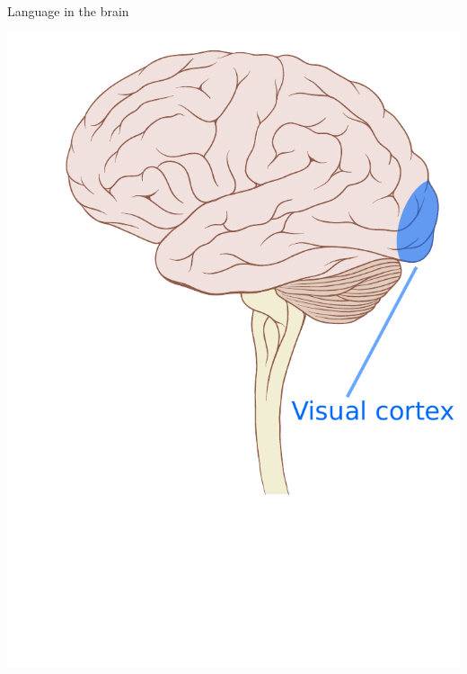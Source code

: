 \documentclass[xcolor=x11names,compress]{beamer}
\renewcommand{\(}{\begin{columns}}
\renewcommand{\)}{\end{columns}}
\newcommand{\<}[1]{\begin{column}{#1}}
\renewcommand{\>}{\end{column}}
\begin{document}
\begin{frame}[t]{Language in the brain}
\begin{center}
{    \includegraphics[height=0.9\textheight]{brain4}
    }
\end{center}
\end{frame}
\end{document}
